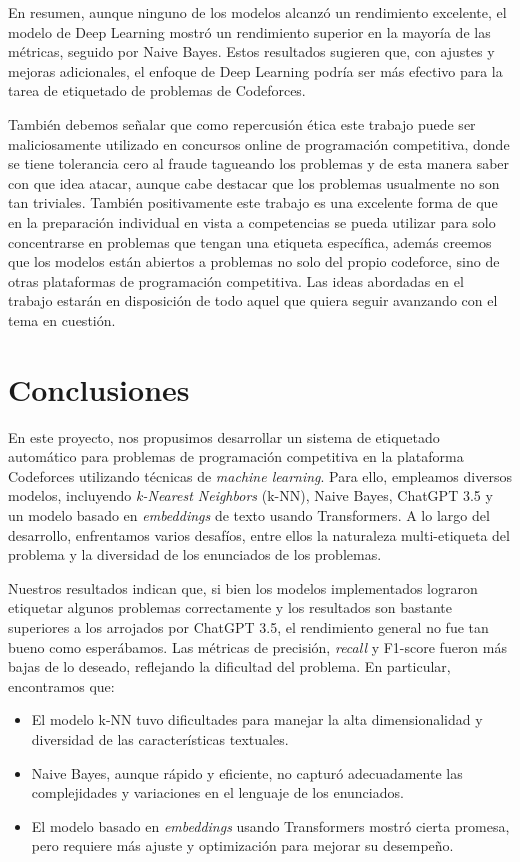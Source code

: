 \documentclass{article}
\begin{document}
En resumen, aunque ninguno de los modelos alcanzó un rendimiento excelente, el modelo de Deep Learning mostró un rendimiento superior en la mayoría de las métricas, seguido por Naive Bayes. Estos resultados sugieren que, con ajustes y mejoras adicionales, el enfoque de Deep Learning podría ser más efectivo para la tarea de etiquetado de problemas de Codeforces.

También debemos señalar que como repercusión ética este trabajo puede ser maliciosamente utilizado en concursos online de 
programación competitiva, donde se tiene tolerancia cero al fraude tagueando los problemas 
y de esta manera saber con que idea atacar, aunque cabe destacar que los problemas usualmente no son tan triviales. También positivamente este trabajo es una excelente forma de que en la preparación individual en vista a competencias se pueda utilizar para solo concentrarse en problemas que tengan una etiqueta específica, además creemos que los modelos están abiertos a problemas no solo del propio codeforce, sino de otras plataformas de programación competitiva. Las ideas abordadas en el trabajo
estarán en disposición de todo aquel que quiera seguir avanzando con el tema en cuestión.

\section{Conclusiones}

En este proyecto, nos propusimos desarrollar un sistema de etiquetado automático para problemas de programación competitiva en la plataforma Codeforces utilizando técnicas de \textit{machine learning}. Para ello, empleamos diversos modelos, incluyendo \textit{k-Nearest Neighbors} (k-NN), Naive Bayes, ChatGPT 3.5 y un modelo basado en \textit{embeddings} de texto usando Transformers. A lo largo del desarrollo, enfrentamos varios desafíos, entre ellos la naturaleza multi-etiqueta del problema y la diversidad de los enunciados de los problemas.

Nuestros resultados indican que, si bien los modelos implementados lograron etiquetar algunos problemas correctamente y los resultados son bastante superiores a los arrojados por ChatGPT 3.5, el rendimiento general no fue tan bueno como esperábamos. Las métricas de precisión, \textit{recall} y F1-score fueron más bajas de lo deseado, reflejando la dificultad del problema. En particular, encontramos que:

\begin{itemize}
    \item El modelo k-NN tuvo dificultades para manejar la alta dimensionalidad y diversidad de las características textuales.
    \item Naive Bayes, aunque rápido y eficiente, no capturó adecuadamente las complejidades y variaciones en el lenguaje de los enunciados.
    \item El modelo basado en \textit{embeddings} usando Transformers mostró cierta promesa, pero requiere más ajuste y optimización para mejorar su desempeño.
\end{itemize}
\end{document}
